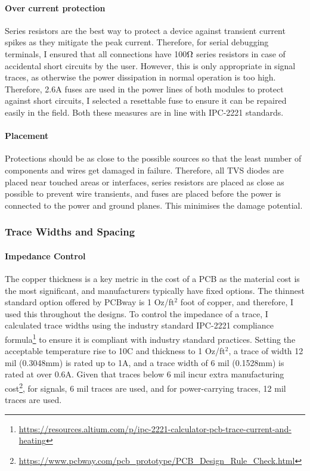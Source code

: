 \paragraph{Over current protection}
Series resistors are the best way to protect a device against transient current spikes as they mitigate the peak current. Therefore, for serial debugging terminals, I ensured that all connections have 100$\ohm$ series resistors in case of accidental short circuits by the user. However, this is only appropriate in signal traces, as otherwise the power dissipation in normal operation is too high. Therefore, 2.6A fuses are used in the power lines of both modules to protect against short circuits, I selected a resettable fuse \cite{bourns} to ensure it can be repaired easily in the field. Both these measures are in line with IPC-2221 standards.
\paragraph{Placement}
Protections should be as close to the possible sources so that the least number of components and wires get damaged in failure. Therefore, all \gls{TVS} diodes are placed near touched areas or interfaces, series resistors are placed as close as possible to prevent wire transients, and fuses are placed before the power is connected to the power and ground planes. This minimises the damage potential.

\subsubsection{Trace Widths and Spacing}\label{sub_sub_section:tgt_trace_width}
\paragraph{Impedance Control}
The copper thickness is a key metric in the cost of a \gls{PCB} as the material cost is the most significant, and manufacturers typically have fixed options. The thinnest standard option offered by PCBway is 1 Oz/ft$^2$ foot of copper, and therefore, I used this throughout the designs. To control the impedance of a trace, I calculated trace widths using the industry standard IPC-2221 compliance formula\footnote{\url{https://resources.altium.com/p/ipc-2221-calculator-pcb-trace-current-and-heating}} to ensure it is compliant with industry standard practices. Setting the acceptable temperature rise to 10\degree C and thickness to 1 Oz/ft$^2$, a trace of width 12 mil (0.3048mm) is rated up to 1A, and a trace width of 6 mil (0.1528mm) is rated at over 0.6A. Given that traces below 6 mil incur extra manufacturing cost\footnote{\url{https://www.pcbway.com/pcb_prototype/PCB_Design_Rule_Check.html}}, for signals, 6 mil traces are used, and for power-carrying traces, 12 mil traces are used.
